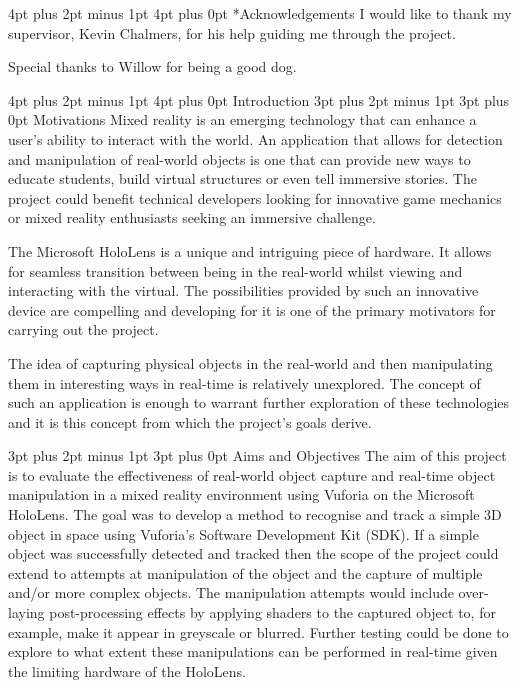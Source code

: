 \documentclass[12pt,a4paper,oneside]{article}
\makeatletter
\renewcommand\subsection{\@startsection {subsection}{1}{0mm} %
                               {3pt plus 2pt minus 1pt} %
                               {3pt plus 0pt} %
                               {\large\bfseries}}
\renewcommand\section{\@startsection {section}{1}{0mm} %
                               {4pt plus 2pt minus 1pt} %
                               {4pt plus 0pt} %
                               {\Large\bfseries}}
\makeatother
\begin{document}
\section*{Acknowledgements}
	I would like to thank my supervisor, Kevin Chalmers, for his help guiding me through the project.
	
	Special thanks to Willow for being a good dog.
\newpage

\section{Introduction}
\subsection{Motivations}
Mixed reality is an emerging technology that can enhance a user's ability to interact with the world. An application that allows for detection and manipulation of real-world objects is one that can provide new ways to educate students, build virtual structures or even tell immersive stories. The project could benefit technical developers looking for innovative game mechanics or mixed reality enthusiasts seeking an immersive challenge.

The Microsoft HoloLens is a unique and intriguing piece of hardware. It allows for seamless transition between being in the real-world whilst viewing and interacting with the virtual. The possibilities provided by such an innovative device are compelling and developing for it is one of the primary motivators for carrying out the project.

The idea of capturing physical objects in the real-world and then manipulating them in interesting ways in real-time is relatively unexplored. The concept of such an application is enough to warrant further exploration of these technologies and it is this concept from which the project's goals derive.

\subsection{Aims and Objectives}
The aim of this project is to evaluate the effectiveness of real-world object capture and real-time object manipulation in a mixed reality environment using Vuforia on the Microsoft HoloLens. The goal was to develop a method to recognise and track a simple 3D object in space using Vuforia's Software Development Kit (SDK). If a simple object was successfully detected and tracked then the scope of the project could extend to attempts at manipulation of the object and the capture of multiple and/or more complex objects. The manipulation attempts would include over-laying post-processing effects by applying shaders to the captured object to, for example, make it appear in greyscale or blurred. Further testing could be done to explore to what extent these manipulations can be performed in real-time given the limiting hardware of the HoloLens.
\end{document}
